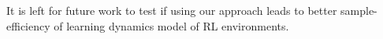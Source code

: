 \documentclass[a4paper,11pt,oneside]{report}
\begin{document}
It is left for future work to test if using our approach leads to better sample-efficiency of learning dynamics model of RL environments.

%
%


\cleardoublepage
{}
{}


\end{document}
